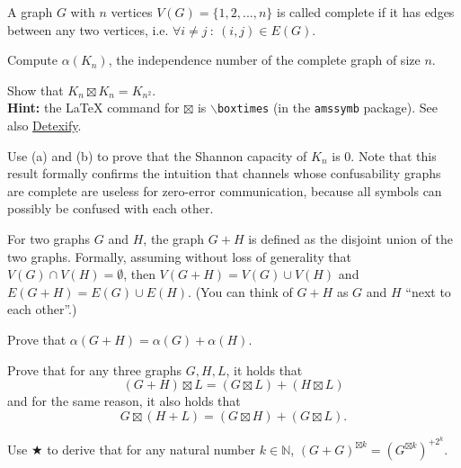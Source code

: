 \documentclass[a4paper,10pt,landscape,twocolumn]{scrartcl}
\begin{document}
\begin{exercise}
A graph $G$ with $n$ vertices $V(G) = \{1,2,...,n\}$ is called complete if it has edges between any two vertices, i.e. $\forall i \neq j \ : \ (i,j) \in E(G)$.
	\begin{subex}[(2pt)]
	Compute $\alpha(K_n)$, the independence number of the complete graph of size $n$.
	\end{subex}
	\begin{subex}[(2pt)]
	Show that $K_n \boxtimes K_n = K_{n^2}$.
	\\\textbf{Hint:} the \LaTeX{} command for $\boxtimes$ is \texttt{$\backslash$boxtimes} (in the \texttt{amssymb} package). See also \href{http://detexify.kirelabs.org/classify.html}{Detexify}.
	\end{subex}
	\begin{subex}[(2pt)]
	Use (a) and (b) to prove that the Shannon capacity of $K_n$ is 0. Note that this result formally confirms the intuition that channels whose confusability graphs are complete are useless for zero-error communication, because all symbols can possibly be confused with each other.
	\end{subex}
\end{exercise}

\begin{exercise}
For two graphs $G$ and $H$, the graph $G + H$ is defined as the disjoint union of the two graphs. Formally, assuming without loss of generality that $V(G) \cap V(H) = \emptyset$, then $V(G + H) = V(G) \cup V(H)$ and $E(G+H) = E(G) \cup E(H)$. (You can think of $G + H$ as $G$ and $H$ ``next to each other''.)
	\begin{subex}[(2pt)]
	Prove that $\alpha(G+H) = \alpha(G) + \alpha(H)$.
	\end{subex}
	\begin{subex**}
	Prove that for any three graphs $G,H,L$, it holds that
	\[
	(G+H) \boxtimes L = (G \boxtimes L) + (H \boxtimes L)
	\]
	and for the same reason, it also holds that
	\[
	G \boxtimes (H + L) = (G \boxtimes H) + (G \boxtimes L).
	\]
	\end{subex**}
	\begin{subex}[(3pt)]
	Use $\bigstar$ to derive that for any natural number $k \in \mathbb{N}$, $(G + G)^{\boxtimes k} = (G^{\boxtimes k})^{+2^k}$.
	\end{subex}
\end{exercise}
\end{document}
